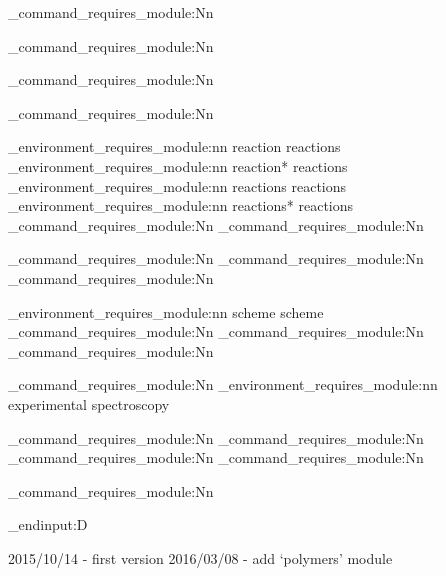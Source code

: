 \chemmacros_command_requires_module:Nn 

\chemmacros_command_requires_module:Nn 

\chemmacros_command_requires_module:Nn 

\chemmacros_command_requires_module:Nn 

\chemmacros_environment_requires_module:nn {reaction}       {reactions}
\chemmacros_environment_requires_module:nn {reaction*}      {reactions}
\chemmacros_environment_requires_module:nn {reactions}      {reactions}
\chemmacros_environment_requires_module:nn {reactions*}     {reactions}
\chemmacros_command_requires_module:Nn     
\chemmacros_command_requires_module:Nn     

\chemmacros_command_requires_module:Nn 
\chemmacros_command_requires_module:Nn 
\chemmacros_command_requires_module:Nn 

\chemmacros_environment_requires_module:nn {scheme}        {scheme}
\chemmacros_command_requires_module:Nn     
\chemmacros_command_requires_module:Nn     
\chemmacros_command_requires_module:Nn     

\chemmacros_command_requires_module:Nn     
\chemmacros_environment_requires_module:nn {experimental} {spectroscopy}

\chemmacros_command_requires_module:Nn 
\chemmacros_command_requires_module:Nn 
\chemmacros_command_requires_module:Nn 
\chemmacros_command_requires_module:Nn 

\chemmacros_command_requires_module:Nn 


\tex_endinput:D

2015/10/14 - first version
2016/03/08 - add `polymers' module

